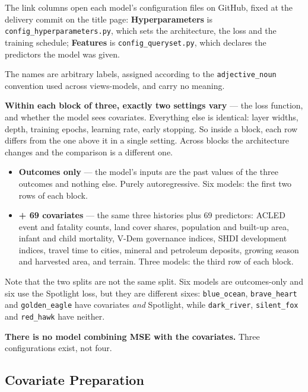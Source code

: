 \noindent The link columns open each model's configuration files on GitHub, fixed at the delivery
commit on the title page: \textbf{Hyperparameters} is \texttt{config\_hyperparameters.py}, which sets the
architecture, the loss and the training schedule; \textbf{Features} is
\texttt{config\_queryset.py}, which declares the predictors the model was given.

The names are arbitrary labels, assigned according to the \texttt{adjective\_noun} convention
used across views-models, and carry no meaning.

\textbf{Within each block of three, exactly two settings vary} --- the loss function, and whether
the model sees covariates. Everything else is identical: layer widths, depth, training epochs,
learning rate, early stopping. So inside a block, each row differs from the one above it in a
single setting. Across blocks the architecture changes and the comparison is a different one.

\begin{itemize}
    \item \textbf{Outcomes only} --- the model's inputs are the past values of the three outcomes
          and nothing else. Purely autoregressive. Six models: the first two rows of each block.
    \item \textbf{+ 69 covariates} --- the same three histories plus 69 predictors: ACLED event and
          fatality counts, land cover shares, population and built-up area, infant and child
          mortality, V-Dem governance indices, SHDI development indices, travel time to cities,
          mineral and petroleum deposits, growing season and harvested area, and terrain. Three
          models: the third row of each block.
\end{itemize}

Note that the two splits are not the same split. Six models are outcomes-only and six use the
Spotlight loss, but they are different sixes: \texttt{blue\_ocean}, \texttt{brave\_heart} and
\texttt{golden\_eagle} have covariates \textit{and} Spotlight, while \texttt{dark\_river},
\texttt{silent\_fox} and \texttt{red\_hawk} have neither.

\textbf{There is no model combining MSE with the covariates.} Three configurations exist, not four.

\subsection*{Covariate Preparation}


